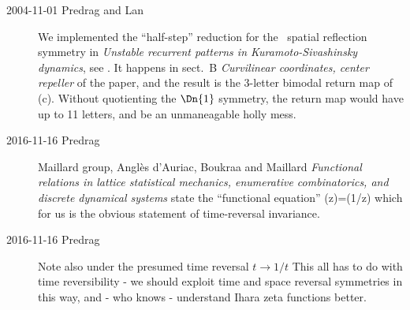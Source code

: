 \begin{description}
    \item[2004-11-01 Predrag and Lan]
We implemented the ``half-step''  reduction
for the \KS\ spatial reflection symmetry in
 {\em
Unstable recurrent patterns in Kuramoto-Sivashinsky
dynamics}, see .
It happens in sect.~B {\em Curvilinear coordinates, center repeller} of
the paper, and the result is the 3-letter bimodal return map of
\,(c). Without quotienting the $\Dn{1}$ symmetry, the
return map would have up to 11 letters, and be an unmaneagable holly mess.



    \item[2016-11-16 Predrag]
Maillard group,
Angl{\`e}s d'Auriac, Boukraa and Maillard
{\em Functional relations in lattice statistical mechanics, enumerative
combinatorics, and discrete dynamical systems}
state the ``functional equation''
\beq
\zeta(z)=\zeta(1/z)
which for us is the obvious statement of time-reversal invariance.

    \item[2016-11-16 Predrag]
Note also  under the presumed time reversal $t\to1/t$
This all has to do with time reversibility - we should exploit time and space
reversal symmetries in this way, and - who knows - understand Ihara zeta
functions better.




\end{description}
